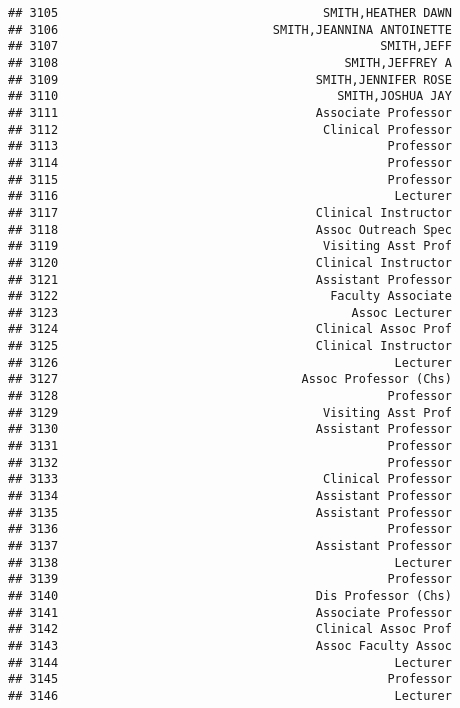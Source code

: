 \documentclass[
]{article}
\begin{document}
\begin{verbatim}
## 3105                                     SMITH,HEATHER DAWN
## 3106                              SMITH,JEANNINA ANTOINETTE
## 3107                                             SMITH,JEFF
## 3108                                        SMITH,JEFFREY A
## 3109                                    SMITH,JENNIFER ROSE
## 3110                                       SMITH,JOSHUA JAY
## 3111                                    Associate Professor
## 3112                                     Clinical Professor
## 3113                                              Professor
## 3114                                              Professor
## 3115                                              Professor
## 3116                                               Lecturer
## 3117                                    Clinical Instructor
## 3118                                    Assoc Outreach Spec
## 3119                                     Visiting Asst Prof
## 3120                                    Clinical Instructor
## 3121                                    Assistant Professor
## 3122                                      Faculty Associate
## 3123                                         Assoc Lecturer
## 3124                                    Clinical Assoc Prof
## 3125                                    Clinical Instructor
## 3126                                               Lecturer
## 3127                                  Assoc Professor (Chs)
## 3128                                              Professor
## 3129                                     Visiting Asst Prof
## 3130                                    Assistant Professor
## 3131                                              Professor
## 3132                                              Professor
## 3133                                     Clinical Professor
## 3134                                    Assistant Professor
## 3135                                    Assistant Professor
## 3136                                              Professor
## 3137                                    Assistant Professor
## 3138                                               Lecturer
## 3139                                              Professor
## 3140                                    Dis Professor (Chs)
## 3141                                    Associate Professor
## 3142                                    Clinical Assoc Prof
## 3143                                    Assoc Faculty Assoc
## 3144                                               Lecturer
## 3145                                              Professor
## 3146                                               Lecturer

\end{verbatim}
\end{document}
